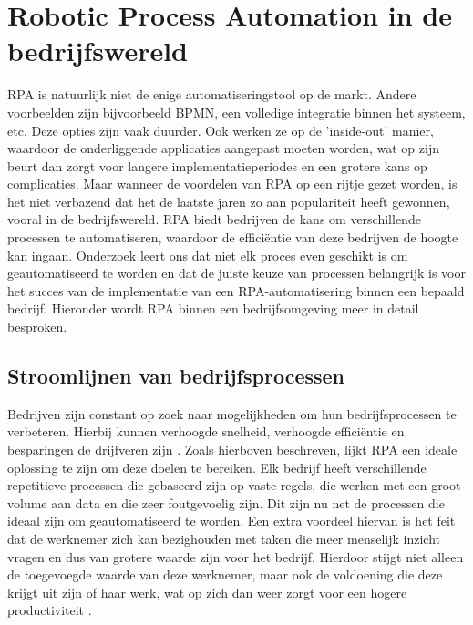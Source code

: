 \section{Robotic Process Automation in de bedrijfswereld}
\label{sec:rpa-in-de-bedrijfswereld}

RPA is natuurlijk niet de enige automatiseringstool op de markt. Andere voorbeelden zijn bijvoorbeeld BPMN, een volledige integratie binnen het systeem, etc. Deze opties zijn vaak duurder. Ook werken ze op de 'inside-out' manier, waardoor de onderliggende applicaties aangepast moeten worden, wat op zijn beurt dan zorgt voor langere implementatieperiodes en een grotere kans op complicaties.
Maar wanneer de voordelen van RPA op een rijtje gezet worden, is het niet verbazend dat het de laatste jaren zo aan populariteit heeft gewonnen, vooral in de bedrijfswereld. RPA biedt bedrijven de kans om verschillende processen te automatiseren, waardoor de efficiëntie van deze bedrijven de hoogte kan ingaan. Onderzoek leert ons dat niet elk proces even geschikt is om geautomatiseerd te worden en dat de juiste keuze van processen belangrijk is voor het succes van de implementatie van een RPA-automatisering binnen een bepaald bedrijf. Hieronder wordt RPA binnen een bedrijfsomgeving meer in detail besproken.

\subsection{Stroomlijnen van bedrijfsprocessen}
\label{subsec:stroomlijnen-van-bedrijfsprocessen}

Bedrijven zijn constant op zoek naar mogelijkheden om hun bedrijfsprocessen te verbeteren. Hierbij kunnen verhoogde snelheid, verhoogde efficiëntie en besparingen de drijfveren zijn \autocite{Axmann2022}. Zoals hierboven beschreven, lijkt RPA een ideale oplossing te zijn om deze doelen te bereiken. Elk bedrijf heeft verschillende repetitieve processen die gebaseerd zijn op vaste regels, die werken met een groot volume aan data en die zeer foutgevoelig zijn. Dit zijn nu net de processen die ideaal zijn om geautomatiseerd te worden. 
Een extra voordeel hiervan is het feit dat de werknemer zich kan bezighouden met taken die meer menselijk inzicht vragen en dus van grotere waarde zijn voor het bedrijf. Hierdoor stijgt niet alleen de toegevoegde waarde van deze werknemer, maar ook de voldoening die deze krijgt uit zijn of haar werk, wat op zich dan weer zorgt voor een hogere productiviteit \autocite{ZalewskaTurzynska2022}.

